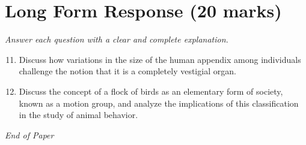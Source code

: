 \documentclass[12pt]{article}
\begin{document}
\section*{Long Form Response (20 marks)}
\textit{Answer each question with a clear and complete explanation.}
\begin{enumerate}[label=\arabic*.]
\setcounter{enumi}{10}
\item Discuss how variations in the size of the human appendix among individuals challenge the notion that it is a completely vestigial organ.
\item Discuss the concept of a flock of birds as an elementary form of society, known as a motion group, and analyze the implications of this classification in the study of animal behavior.
\end{enumerate}

\vfill
\noindent\textit{End of Paper}
\end{document}
